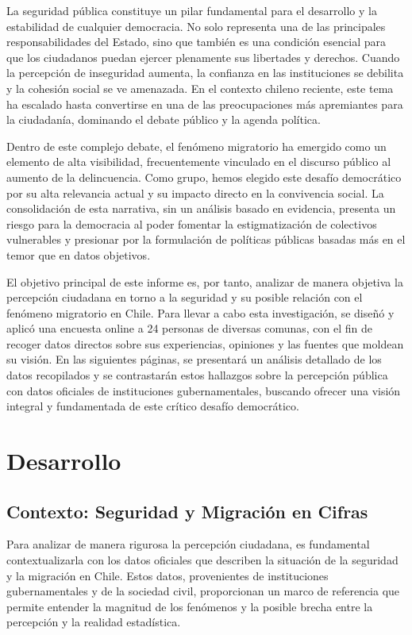\documentclass[12pt, a4paper]{article}
\begin{document}
La seguridad pública constituye un pilar fundamental para el desarrollo y la estabilidad de cualquier democracia. No solo representa una de las principales responsabilidades del Estado, sino que también es una condición esencial para que los ciudadanos puedan ejercer plenamente sus libertades y derechos. Cuando la percepción de inseguridad aumenta, la confianza en las instituciones se debilita y la cohesión social se ve amenazada. En el contexto chileno reciente, este tema ha escalado hasta convertirse en una de las preocupaciones más apremiantes para la ciudadanía, dominando el debate público y la agenda política.

Dentro de este complejo debate, el fenómeno migratorio ha emergido como un elemento de alta visibilidad, frecuentemente vinculado en el discurso público al aumento de la delincuencia. Como grupo, hemos elegido este desafío democrático por su alta relevancia actual y su impacto directo en la convivencia social. La consolidación de esta narrativa, sin un análisis basado en evidencia, presenta un riesgo para la democracia al poder fomentar la estigmatización de colectivos vulnerables y presionar por la formulación de políticas públicas basadas más en el temor que en datos objetivos.

El objetivo principal de este informe es, por tanto, analizar de manera objetiva la percepción ciudadana en torno a la seguridad y su posible relación con el fenómeno migratorio en Chile. Para llevar a cabo esta investigación, se diseñó y aplicó una encuesta online a 24 personas de diversas comunas, con el fin de recoger datos directos sobre sus experiencias, opiniones y las fuentes que moldean su visión. En las siguientes páginas, se presentará un análisis detallado de los datos recopilados y se contrastarán estos hallazgos sobre la percepción pública con datos oficiales de instituciones gubernamentales, buscando ofrecer una visión integral y fundamentada de este crítico desafío democrático.
\newpage

\section{Desarrollo}
\subsection{Contexto: Seguridad y Migración en Cifras}
Para analizar de manera rigurosa la percepción ciudadana, es fundamental contextualizarla con los datos oficiales que describen la situación de la seguridad y la migración en Chile. Estos datos, provenientes de instituciones gubernamentales y de la sociedad civil, proporcionan un marco de referencia que permite entender la magnitud de los fenómenos y la posible brecha entre la percepción y la realidad estadística.
\end{document}
